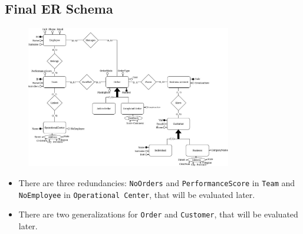 \subsection{Final ER Schema}
\begin{figure}[H]
    \centering
    \includegraphics[width=0.8\textwidth]{img/ER.jpg}
\end{figure}

\begin{itemize}[label=-]
    \item There are three redundancies: \texttt{NoOrders} and \texttt{PerformanceScore} in \texttt{Team} and \texttt{NoEmployee} in \texttt{Operational Center}, that will be evaluated later.
    \item There are two generalizations for \texttt{Order} and \texttt{Customer}, that will be evaluated later.
\end{itemize}

